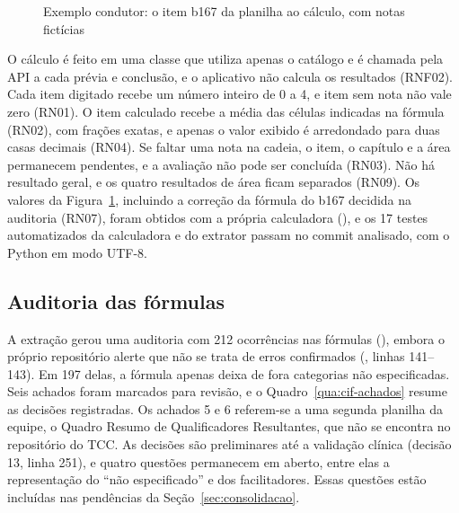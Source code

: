 \begin{figure}[H]
	\caption{Exemplo condutor: o item b167 da planilha ao cálculo, com notas fictícias}
	\label{fig:cif-b167}
\end{figure}

O cálculo é feito em uma classe que utiliza apenas o catálogo e é chamada pela API a cada prévia e conclusão, e o
aplicativo não calcula os resultados (RNF02). Cada item digitado recebe um número inteiro de 0 a 4, e item sem nota
não vale zero (RN01). O item calculado recebe a média das células indicadas na fórmula (RN02), com frações exatas, e
apenas o valor exibido é arredondado para duas casas decimais (RN04). Se faltar uma nota na cadeia, o item, o
capítulo e a área permanecem pendentes, e a avaliação não pode ser concluída (RN03). Não há resultado geral, e os
quatro resultados de área ficam separados (RN09). Os valores da Figura~\ref{fig:cif-b167}, incluindo a correção da
fórmula do b167 decidida na auditoria (RN07), foram obtidos com a própria calculadora
(), e os 17 testes automatizados da calculadora e do extrator passam no
commit analisado, com o Python em modo UTF-8.

\subsection{Auditoria das fórmulas}
\label{sec:cif-auditoria}

A extração gerou uma auditoria com 212 ocorrências nas fórmulas (), embora o
próprio repositório alerte que não se trata de erros confirmados (, linhas
141--143). Em 197 delas, a fórmula apenas deixa de fora categorias não especificadas. Seis achados foram marcados
para revisão, e o Quadro~\ref{qua:cif-achados} resume as decisões registradas. Os achados 5 e 6 referem-se a uma
segunda planilha da equipe, o Quadro Resumo de Qualificadores Resultantes, que não se encontra no repositório do TCC.
As decisões são preliminares até a validação clínica (decisão 13, linha 251), e quatro questões permanecem em aberto,
entre elas a representação do ``não especificado'' e dos facilitadores. Essas questões estão incluídas nas pendências
da Seção~\ref{sec:consolidacao}.

